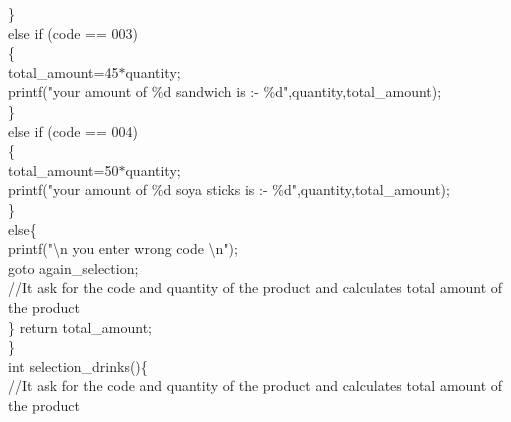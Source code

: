 \documentclass[10pt,a4paper]{article}
\begin{document}
\begin{flushleft}
    \hspace*{0.5cm}  \}\\
    \hspace*{0.5cm}  else if (code == 003)\\
    \hspace*{0.5cm}  \{\\
    \hspace*{0.5cm}  \hspace*{0.5cm}total\_amount=45$\ast$quantity;\\
    \hspace*{0.5cm}  \hspace*{0.5cm}printf("your amount of \%d sandwich is :- \%d",quantity,total\_amount);\\
    \hspace*{0.5cm}  \}\\
    \hspace*{0.5cm}  else if (code == 004)\\
    \hspace*{0.5cm}  \{\\
    \hspace*{0.5cm}  \hspace*{0.5cm}total\_amount=50$\ast$quantity;\\
    \hspace*{0.5cm}  \hspace*{0.5cm}printf("your amount of \%d soya sticks is :- \%d",quantity,total\_amount);\\
    \hspace*{0.5cm}  \}\\
    \hspace*{0.5cm}  else\{\\
    \hspace*{0.5cm}  \hspace*{0.5cm}printf("\textbackslash n you enter wrong code \textbackslash n");\\
    \hspace*{0.5cm}  \hspace*{0.5cm}goto again\_selection;\\ //It ask for the code and quantity of the product and calculates total amount of the product\\
    \hspace*{0.5cm}  \}
    \hspace*{0.5cm}  return total\_amount;\\
\}\\
int selection\_drinks()\{\\   //It ask for the code and quantity of the product and calculates total amount of the product \\

\end{flushleft}
\end{document}
